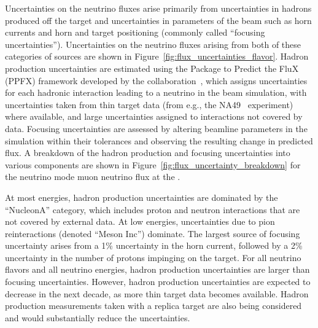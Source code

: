 Uncertainties on the neutrino fluxes arise primarily from uncertainties in hadrons produced off the target and uncertainties in parameters of the beam such as horn currents and horn and target positioning (commonly called ``focusing uncertainties'').  Uncertainties on the neutrino fluxes arising from both of these categories of sources are shown in Figure~\ref{fig:flux_uncertainties_flavor}.  Hadron production uncertainties are estimated using the Package to Predict the FluX (PPFX) framework developed by the \minerva collaboration~\cite{Aliaga:2016oaz, AliagaSoplin:2016shs}, which assigns uncertainties for each hadronic interaction leading to a neutrino in the beam simulation, with uncertainties taken from thin target data (from e.g., the NA49~\cite{NA49} experiment) where available, and large uncertainties assigned to interactions not covered by data.  Focusing uncertainties are assessed by altering beamline parameters in the simulation within their tolerances and observing the resulting change in predicted flux.  A breakdown of the hadron production and focusing uncertainties into various components are shown in Figure~\ref{fig:flux_uncertainty_breakdown} for the neutrino mode muon neutrino flux at the .    

At most energies, hadron production uncertainties are dominated by the ``NucleonA'' category, which includes proton and neutron interactions that are not covered by external data.  At low energies, uncertainties due to pion reinteractions (denoted ``Meson Inc'') dominate.   The largest source of focusing uncertainty arises from a 1\% uncertainty in the horn current, followed by a 2\% %
uncertainty in the number of protons impinging on the target.   For all neutrino flavors and all neutrino energies, hadron production uncertainties are larger than focusing uncertainties.  However, hadron production uncertainties are expected to decrease in the next decade, as more thin target data becomes available.  Hadron production measurements taken with a replica target are also being considered and would substantially reduce the uncertainties.  

